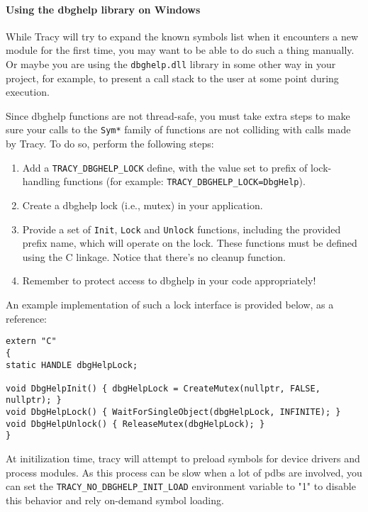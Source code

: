 \documentclass[hidelinks,titlepage,a4paper,twoside]{article}
\begin{document}
\paragraph{Using the dbghelp library on Windows}

While Tracy will try to expand the known symbols list when it encounters a new module for the first time, you may want to be able to do such a thing manually. Or maybe you are using the \texttt{dbghelp.dll} library in some other way in your project, for example, to present a call stack to the user at some point during execution.

Since dbghelp functions are not thread-safe, you must take extra steps to make sure your calls to the \texttt{Sym*} family of functions are not colliding with calls made by Tracy. To do so, perform the following steps:

\begin{enumerate}
\item Add a \texttt{TRACY\_DBGHELP\_LOCK} define, with the value set to prefix of lock-handling functions (for example: \texttt{TRACY\_DBGHELP\_LOCK=DbgHelp}).
\item Create a dbghelp lock (i.e., mutex) in your application.
\item Provide a set of \texttt{Init}, \texttt{Lock} and \texttt{Unlock} functions, including the provided prefix name, which will operate on the lock. These functions must be defined using the C linkage. Notice that there's no cleanup function.
\item Remember to protect access to dbghelp in your code appropriately!
\end{enumerate}

An example implementation of such a lock interface is provided below, as a reference:

\begin{lstlisting}
extern "C"
{
static HANDLE dbgHelpLock;

void DbgHelpInit() { dbgHelpLock = CreateMutex(nullptr, FALSE, nullptr); }
void DbgHelpLock() { WaitForSingleObject(dbgHelpLock, INFINITE); }
void DbgHelpUnlock() { ReleaseMutex(dbgHelpLock); }
}
\end{lstlisting}

At initilization time, tracy will attempt to preload symbols for device drivers and process modules. As this process can be slow when a lot of pdbs are involved, you can set the \texttt{TRACY\_NO\_DBGHELP\_INIT\_LOAD} environment variable to "1" to disable this behavior and rely on-demand symbol loading.
\end{document}
